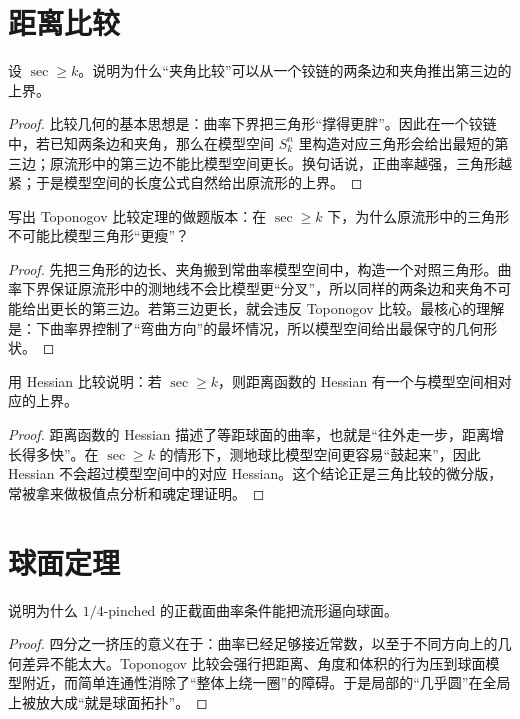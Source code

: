 \documentclass[11pt,a4paper,openany]{ctexbook}
\numberwithin{equation}{chapter}
\begin{document}
\section{距离比较}

\begin{problem}
设 \(\sec\ge k\)。说明为什么“夹角比较”可以从一个铰链的两条边和夹角推出第三边的上界。
\end{problem}
\begin{proof}
比较几何的基本思想是：曲率下界把三角形“撑得更胖”。因此在一个铰链中，若已知两条边和夹角，那么在模型空间 \(S_k^n\) 里构造对应三角形会给出最短的第三边；原流形中的第三边不能比模型空间更长。换句话说，正曲率越强，三角形越紧；于是模型空间的长度公式自然给出原流形的上界。  
\end{proof}

\begin{problem}
写出 Toponogov 比较定理的做题版本：在 \(\sec\ge k\) 下，为什么原流形中的三角形不可能比模型三角形“更瘦”？
\end{problem}
\begin{proof}
先把三角形的边长、夹角搬到常曲率模型空间中，构造一个对照三角形。曲率下界保证原流形中的测地线不会比模型更“分叉”，所以同样的两条边和夹角不可能给出更长的第三边。若第三边更长，就会违反 Toponogov 比较。最核心的理解是：下曲率界控制了“弯曲方向”的最坏情况，所以模型空间给出最保守的几何形状。  
\end{proof}

\begin{problem}
用 Hessian 比较说明：若 \(\sec\ge k\)，则距离函数的 Hessian 有一个与模型空间相对应的上界。
\end{problem}
\begin{proof}
距离函数的 Hessian 描述了等距球面的曲率，也就是“往外走一步，距离增长得多快”。在 \(\sec\ge k\) 的情形下，测地球比模型空间更容易“鼓起来”，因此 Hessian 不会超过模型空间中的对应 Hessian。这个结论正是三角比较的微分版，常被拿来做极值点分析和魂定理证明。  
\end{proof}

\section{球面定理}

\begin{problem}
说明为什么 \(1/4\)-pinched 的正截面曲率条件能把流形逼向球面。
\end{problem}
\begin{proof}
四分之一挤压的意义在于：曲率已经足够接近常数，以至于不同方向上的几何差异不能太大。Toponogov 比较会强行把距离、角度和体积的行为压到球面模型附近，而简单连通性消除了“整体上绕一圈”的障碍。于是局部的“几乎圆”在全局上被放大成“就是球面拓扑”。  
\end{proof}
\end{document}
